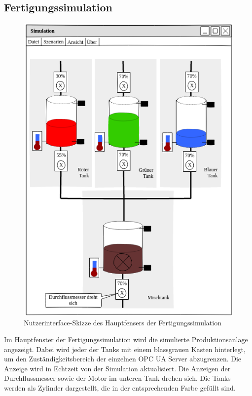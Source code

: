 \documentclass[parskip=full]{scrartcl}
\begin{document}
\subsection{Fertigungssimulation}
\begin{figure}[H]
  \centering
  \includegraphics[scale=0.5]{media/ui-server/ui-server-main.png}
  \caption{Nutzerinterface-Skizze des Hauptfensers der Fertigungssimulation}
\end{figure}
Im Hauptfenster der \gls{Fertigungssimulation} wird die simulierte \gls{Produktionsanlage} angezeigt. Dabei wird jeder der Tanks
mit einem blassgrauen Kasten hinterlegt, um den Zuständigkeitsbereich der einzelnen \gls{OPC UA Server} abzugrenzen. Die Anzeige wird
in Echtzeit von der Simulation aktualisiert. Die Anzeigen der Durchflussmesser sowie der Motor im unteren Tank drehen sich.
Die Tanks werden als Zylinder dargestellt, die in der entsprechenden Farbe gefüllt sind.
\end{document}
